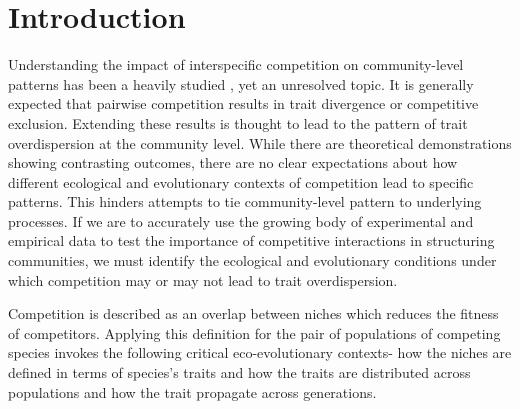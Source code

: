 \documentclass[12pt]{article}
\begin{document}
\clearpage

\linenumbers
\section{Introduction}

\begin{comment}
Make a more clear convergence definition and connect it to Fig 1 and 2.
\end{comment}

Understanding the impact of interspecific competition on community-level patterns has been a heavily studied \cite[e.g.,][]{Schoener1965,Roughgarden1974,Connell1980,Roughgarden1983,Scheffer2006,Davies2007}, yet an unresolved topic. It is generally expected that pairwise competition results in trait divergence or competitive exclusion. Extending these results is thought to lead to the pattern of trait overdispersion at the community level\cite[e.g.,][]{Schoener1965,Connell1980,schluter1994experimental,Davies2007}. While there are theoretical demonstrations showing contrasting outcomes\cite[e.g.][]{abrams1990ecological,Roughgarden1983,Scheffer2006}, there are no clear expectations about how different ecological and evolutionary contexts of competition lead to specific patterns. This hinders attempts to tie community-level pattern to underlying processes. If we are to accurately use the growing body of experimental and empirical data to test the importance of competitive interactions in structuring communities, we must identify the ecological and evolutionary conditions under which competition may or may not lead to trait overdispersion.\par

  Competition is described as an overlap between niches which reduces the fitness of competitors. Applying this definition for the pair of populations of competing species invokes the following critical eco-evolutionary contexts- how the niches are defined in terms of species's traits and how the traits are distributed across populations and how the trait propagate across generations.  
\end{document}
